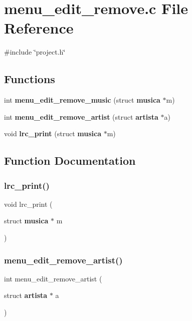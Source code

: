 \section{menu\+\_\+edit\+\_\+remove.\+c File Reference}
\label{menu__edit__remove_8c}
{\ttfamily \#include \char`\"{}project.\+h\char`\"{}}\newline
\subsection*{Functions}
\begin{DoxyCompactItemize}
\item 
int \textbf{ menu\+\_\+edit\+\_\+remove\+\_\+music} (struct \textbf{ musica} $\ast$m)
\item 
int \textbf{ menu\+\_\+edit\+\_\+remove\+\_\+artist} (struct \textbf{ artista} $\ast$a)
\item 
void \textbf{ lrc\+\_\+print} (struct \textbf{ musica} $\ast$m)
\end{DoxyCompactItemize}


\subsection{Function Documentation}
\mbox{\label{menu__edit__remove_8c_a6532a6f938a3cc8b70d7c43fafc1422e}} 
\subsubsection{lrc\_print()}
{\footnotesize\ttfamily void lrc\+\_\+print (\begin{DoxyParamCaption}\item[{struct \textbf{ musica} $\ast$}]{m }\end{DoxyParamCaption})}

\mbox{\label{menu__edit__remove_8c_ade4b36ae37d77141b3131c7758bed507}} 
\subsubsection{menu\_edit\_remove\_artist()}
{\footnotesize\ttfamily int menu\+\_\+edit\+\_\+remove\+\_\+artist (\begin{DoxyParamCaption}\item[{struct \textbf{ artista} $\ast$}]{a }\end{DoxyParamCaption})}

